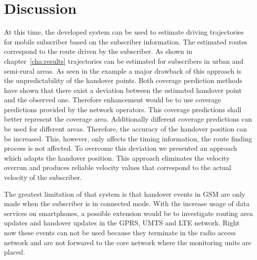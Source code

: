\section{Discussion}
At this time, the developed system can be used to estimate driving trajectories for mobile subscriber based on the subscriber information. The estimated routes correspond to the route driven by the subscriber. As shown in chapter~\ref{cha:results} trajectories can be estimated for subscribers in urban and semi-rural areas. As seen in the example a major drawback of this approach is the unpredictability of the handover points. Both coverage perdiction methods have shown that there exist a deviation between the estimated handover point and the observed one. Therefore enhancement would be to use coverage predictions provided by the network operators. This coverage predictions shall better represent the coverage area. Additionally different coverage predictions can be used for different areas. Therefore, the accuracy of the handover position can be increased. This, however, only affects the timing information, the route finding process is not affected.
To overcome this deviation we presented an approach which adapts the handover position. This approach eliminates the velocity overrun and produces reliable velocity values that correspond to the actual velocity of the subscriber.

The greatest limitation of that system is that handover events in GSM are only made when the subscriber is in connected mode. With the increase usage of data services on smartphones, a possible extension would be to investigate routing area updates and handover updates in the GPRS, UMTS and LTE network. Right now these events can not be used because they terminate in the radio access network and are not forwared to the core network where the monitoring units are placed.
